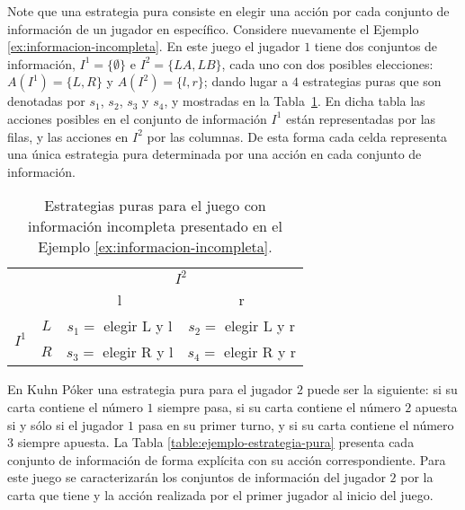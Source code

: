 Note que una estrategia pura consiste en elegir una acción por cada conjunto de información de un jugador en específico. Considere nuevamente el Ejemplo \ref{ex:informacion-incompleta}. En este juego el jugador $1$ tiene dos conjuntos de información, $I^1 = \{\emptyset\}$ e $I^2 = \{LA, LB\}$, cada uno con dos posibles elecciones: $A(I^1) = \{L, R\}$ y $A(I^2) = \{l, r\}$; dando lugar a $4$ estrategias puras que son denotadas por $s_1$, $s_2$, $s_3$ y $s_4$, y mostradas en la Tabla~\ref{table:estrategias-puras}. En dicha tabla las acciones posibles en el conjunto de información $I^1$ están representadas por las filas, y las acciones en $I^2$ por las columnas. De esta forma cada celda representa una única estrategia pura determinada por una acción en cada conjunto de información.

\begin{table}[h]
\begin{center}
\caption{Estrategias puras para el juego con información incompleta presentado en el Ejemplo \ref{ex:informacion-incompleta}.}
\label{table:estrategias-puras}
\begin{tabular}{c c | c | c | }
 \multicolumn{2}{c}{} & \multicolumn{2}{c}{$I^2$} \\
 \multicolumn{2}{c}{} & \multicolumn{1}{c}{l} & \multicolumn{1}{c}{r} \\ \cline{3-4}
 \multirow{2}{*}{$I^1$} & $L$ & $s_1=$  elegir L y l & $s_2=$ elegir L y r\\ \cline{3-4}
 & $R$ & $s_3=$ elegir R y l & $s_4=$ elegir R y r \\ \cline{3-4}
\end{tabular}
\end{center}
\end{table}

En Kuhn Póker una estrategia pura para el jugador $2$ puede ser la siguiente: si su carta contiene el número $1$ siempre pasa, si su carta contiene el número $2$ apuesta si y sólo si el jugador $1$ pasa en su primer turno, y si su carta contiene el número $3$ siempre apuesta. La Tabla \ref{table:ejemplo-estrategia-pura} presenta cada conjunto de información de forma explícita con su acción correspondiente. Para este juego se caracterizarán los conjuntos de información del jugador $2$ por la carta que tiene y la acción realizada por el primer jugador al inicio del juego.

